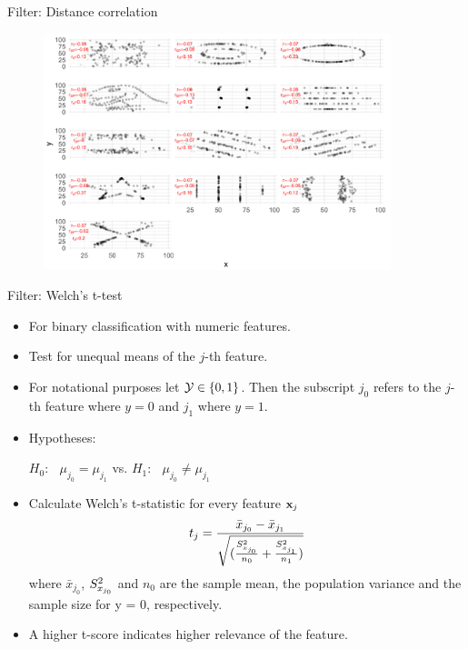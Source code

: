 \begin{vbframe}{Filter: Distance correlation}
\begin{figure}
\includegraphics[width = 0.9\textwidth]{figure_man/distance-corre.png}
\end{figure}


\end{vbframe}




\begin{vbframe}{Filter: Welch's \MakeLowercase{t}-test}
\begin{itemize}
  \item For binary classification with numeric features.
  \item Test for unequal means of the $j$-th feature.
  \item For notational purposes let $\mathcal{Y} \in \{ 0, 1\}$. Then the subscript $j_0$ refers to the $j$-th feature where $y = 0$ and $j_1$ where $y = 1$.
  \item Hypotheses:

  $H_0$: $\;\;\mu_{j_0} = \mu_{j_1} $ \qquad vs. \qquad $H_1$: $\;\;\mu_{j_0} \neq \mu_{j_1}$
  \item Calculate Welch's t-statistic for every feature $\mathbf{x}_j$
  $$ t_j = \frac{\bar{x}_{j_0} - \bar{x}_{j_1}}{\sqrt{(\frac{S^2_{x_{j_0}}}{n_0} + \frac{S^2_{x_{j_1}}}{n_1})}}$$
  where $\bar{x}_{j_0}$, $S^2_{x_{j_0}}$ and $n_0$ are the sample mean, the population variance and the sample size for y = 0, respectively.
  \item A higher t-score indicates higher relevance of the feature.
\end{itemize}
\end{vbframe}



